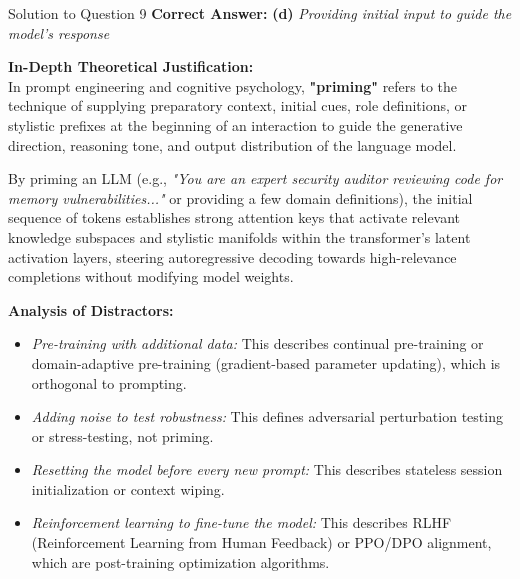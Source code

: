 \documentclass[11pt,a4paper]{article}
\begin{document}
\begin{solutionbox}{Solution to Question 9}
\textbf{Correct Answer:} \textbf{(d)} \textit{Providing initial input to guide the model's response}

\medskip
\textbf{In-Depth Theoretical Justification:}\\
In prompt engineering and cognitive psychology, \textbf{"priming"} refers to the technique of supplying preparatory context, initial cues, role definitions, or stylistic prefixes at the beginning of an interaction to guide the generative direction, reasoning tone, and output distribution of the language model.

By priming an LLM (e.g., \textit{"You are an expert security auditor reviewing code for memory vulnerabilities..."} or providing a few domain definitions), the initial sequence of tokens establishes strong attention keys that activate relevant knowledge subspaces and stylistic manifolds within the transformer's latent activation layers, steering autoregressive decoding towards high-relevance completions without modifying model weights.

\medskip
\textbf{Analysis of Distractors:}
\begin{itemize}[leftmargin=1.5cm]
    \item[\textbf{(a)}] \textit{Pre-training with additional data:} This describes continual pre-training or domain-adaptive pre-training (gradient-based parameter updating), which is orthogonal to prompting.
    \item[\textbf{(b)}] \textit{Adding noise to test robustness:} This defines adversarial perturbation testing or stress-testing, not priming.
    \item[\textbf{(c)}] \textit{Resetting the model before every new prompt:} This describes stateless session initialization or context wiping.
    \item[\textbf{(e)}] \textit{Reinforcement learning to fine-tune the model:} This describes RLHF (Reinforcement Learning from Human Feedback) or PPO/DPO alignment, which are post-training optimization algorithms.
\end{itemize}
\end{solutionbox}

\bigskip
\end{document}

